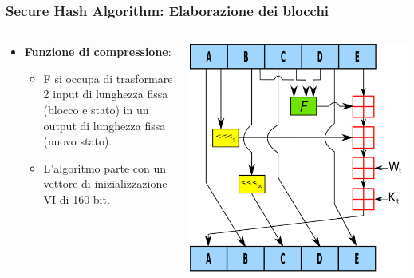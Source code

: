 \begin{frame}
	\frametitle{Secure Hash Algorithm: Elaborazione dei blocchi}

	\begin{columns}
		\begin{column}{0.6\textwidth}
			\begin{itemize}
				\item \textbf{Funzione di compressione}:
				      \begin{itemize}
					      \item F si occupa di trasformare 2 input di lunghezza fissa (blocco e stato) in un output di lunghezza fissa (nuovo stato).
					      \item L'algoritmo parte con un vettore di inizializzazione VI di 160 bit.				      \end{itemize}
			\end{itemize}
		\end{column}

		\begin{column}{0.4\textwidth}
			\includegraphics[width=\textwidth]{img/1-img/SHA-1.png}
		\end{column}
	\end{columns}

\end{frame}